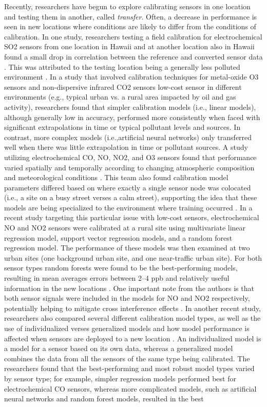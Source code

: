 \documentclass[journal abbreviation, manuscript]{copernicus}
\begin{document}
Recently, researchers have begun to explore calibrating sensors in one location and testing them in another, called \textit{transfer}.  Often, a decrease in performance is seen in new locations where conditions are likely to differ from the conditions of calibration.  In one study, researchers testing a field calibration for electrochemical SO2 sensors from one location in Hawaii and at another location also in Hawaii found a small drop in correlation between the reference and converted sensor data \citep{Hagan2018}. This was attributed to the testing location being a generally less polluted environment \citep{Hagan2018}.  In a study that involved calibration techniques for metal-oxide O3 sensors and non-dispersive infrared CO2 sensors low-cost sensor in different environments (e.g., typical urban vs. a rural area impacted by oil and gas activity), researchers found that simpler calibration models (i.e., linear models), although generally low in accuracy, performed more consistently when faced with significant extrapolations in time or typical pollutant levels and sources\citep{Casey2018testing}. In contrast, more complex models (i.e.,artificial neural networks) only transferred well when there was little extrapolation in time or pollutant sources.  A study utilizing electrochemical CO, NO, NO2, and O3 sensors found that performance varied spatially and temporally according to changing atmospheric composition and meteorological conditions \citep{Castell2017}. This team also found calibration model parameters differed based on where exactly a single sensor node was colocated (i.e., a site on a busy street verses a calm street), supporting the idea that these models are being specialized to the environment where training occurred \citep{Castell2017}.  In a recent study targeting this particular issue with low-cost sensors, electrochemical NO and NO2 sensors were calibrated at a rural site using multivariate linear regression model, support vector regression models, and a random forest regression model. The performance of these models was then examined at two urban sites (one background urban site, and one near-traffic urban site). For both sensor types random forests were found to be the best-performing models, resulting in mean averages errors between 2–4 ppb and relatively useful information in the new locations \citep{Bigi2018Performance}. One important note from the authors is that both sensor signals were included in the models for NO and NO2 respectively, potentially helping to mitigate cross interference effects \citep{Bigi2018Performance}. In another recent study, researchers also compared several different calibration model types, as well as the use of individualized verses generalized models and how model performance is affected when sensors are deployed to a new location \citep{Malings2018Development}.  An individualized model is a model for a sensor based on its own data, whereas a generalized model combines the data from all the sensors of the same type being calibrated. The researchers found that the best-performing and most robust model types varied by sensor type; for example, simpler regression models performed best for electrochemical CO sensors, whereas more complicated models, such as artificial neural networks and random forest models, resulted in the best 
\end{document}
